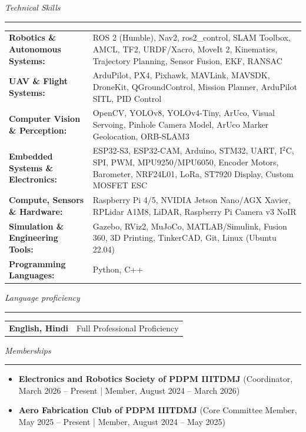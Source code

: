 \documentclass[10pt,a4paper]{article}
\newcommand{\cvsection}[1]{%
  \vspace{7pt}%
  {\color{cvblue}\itshape\large #1}\\[-4pt]%
  {\color{cvblue}\rule{\textwidth}{0.75pt}}\vspace{3pt}%
}
\begin{document}
\cvsection{Technical Skills}
\begin{tabularx}{\textwidth}{@{}p{5.6cm}X@{}}
  \textbf{Robotics \& Autonomous Systems:} & ROS 2 (Humble), Nav2, ros2\_control, SLAM Toolbox, AMCL, TF2, URDF/Xacro, MoveIt 2, Kinematics, Trajectory Planning, Sensor Fusion, EKF, RANSAC\\[3pt]
  \textbf{UAV \& Flight Systems:} & ArduPilot, PX4, Pixhawk, MAVLink, MAVSDK, DroneKit, QGroundControl, Mission Planner, ArduPilot SITL, PID Control\\[3pt]
  \textbf{Computer Vision \& Perception:} & OpenCV, YOLOv8, YOLOv4-Tiny, ArUco, Visual Servoing, Pinhole Camera Model, ArUco Marker Geolocation, ORB-SLAM3\\[3pt]
  \textbf{Embedded Systems \& Electronics:} & ESP32-S3, ESP32-CAM, Arduino, STM32, UART, I$^2$C, SPI, PWM, MPU9250/MPU6050, Encoder Motors, Barometer, NRF24L01, LoRa, ST7920 Display, Custom MOSFET ESC\\[3pt]
  \textbf{Compute, Sensors \& Hardware:} & Raspberry Pi 4/5, NVIDIA Jetson Nano/AGX Xavier, RPLidar A1M8, LiDAR, Raspberry Pi Camera v3 NoIR\\[3pt]
  \textbf{Simulation \& Engineering Tools:} & Gazebo, RViz2, MuJoCo, MATLAB/Simulink, Fusion 360, 3D Printing, TinkerCAD, Git, Linux (Ubuntu 22.04)\\[3pt]
  \textbf{Programming Languages:} & Python, C++\\
\end{tabularx}

\cvsection{Language proficiency}
\begin{tabularx}{\textwidth}{@{}p{5.1cm}X@{}}
  \textbf{English, Hindi} & Full Professional Proficiency\\
\end{tabularx}

\cvsection{Memberships}
\begin{itemize}[leftmargin=1.2rem,itemsep=2pt,topsep=2pt,parsep=0pt]
  \item \textbf{Electronics and Robotics Society of PDPM IIITDMJ} (Coordinator, March 2026 – Present | Member, August 2024 – March 2026)
  \item \textbf{Aero Fabrication Club of PDPM IIITDMJ} (Core Committee Member, May 2025 – Present | Member, August 2024 – May 2025)
\end{itemize}
\end{document}
